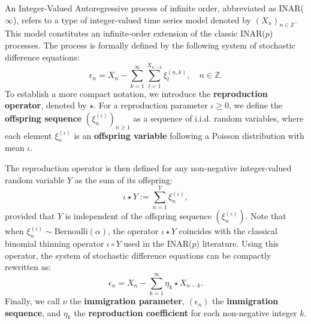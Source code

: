 \documentclass[letterpaper]{article}
\numberwithin{equation}{section}
\theoremstyle{definition}
\theoremstyle{remark}
\begin{document}
An Integer-Valued Autoregressive process of infinite order, abbreviated as INAR($\infty$), refers to a type of integer-valued time series model denoted by $(X_n)_{n \in \mathbb{Z}}$. This model constitutes an infinite-order extension of the classic INAR($p$) processes. The process is formally defined by the following system of stochastic difference equations:
\[
  \epsilon_n = X_n - \sum_{k=1}^\infty \sum_{l=1}^{X_{n-k}} \xi_l^{(n,k)}, \quad n \in \mathbb{Z}.
\]
To establish a more compact notation, we introduce the \textbf{reproduction operator}, denoted by $\star$. For a reproduction parameter $\iota \ge 0$, we define the \textbf{offspring sequence} $(\xi_n^{(\iota)})_{n \ge 1}$ as a sequence of i.i.d. random variables, where each element $\xi_n^{(\iota)}$ is an \textbf{offspring variable} following a Poisson distribution with mean $\iota$.

The reproduction operator is then defined for any non-negative integer-valued random variable $Y$ as the sum of its offspring:
\[
  {\iota \star Y} := \sum_{n=1}^Y \xi_n^{(\iota)},
\]
provided that $Y$ is independent of the offspring sequence $(\xi_n^{(\iota)})$. {Note that when $\xi_n^{(\iota)}\sim \mathrm{Bernoulli}(\alpha)$, the operator $\iota \star Y$ coincides with the classical binomial thinning operator $\iota \circ Y$ used in the INAR($p$) literature.}
Using this operator, the system of stochastic difference equations can be compactly rewritten as:
\[
  \epsilon_n = X_n - \sum_{k=1}^\infty {\eta_k \star X_{n-k}}.
\]
Finally, we {call}
$\nu$ the \textbf{immigration parameter}, $(\epsilon_n)$ the \textbf{immigration sequence}, and $\eta_k$ the \textbf{reproduction coefficient} for each non-negative integer $k$.
\end{document}
